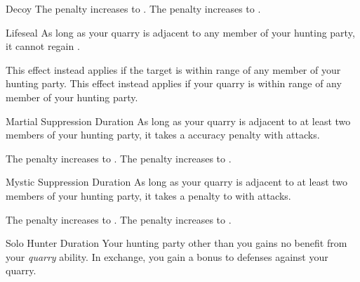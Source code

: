 {\begin{durationability}{Decoy}
                \rankline
                 The penalty increases to .
                 The penalty increases to .
            \end{durationability}

            \begin{durationability}{Lifeseal}
                \rankline
                As long as your quarry is adjacent to any member of your hunting party, it cannot regain .

                \rankline
                 This effect instead applies if the target is within \rngmed range of any member of your hunting party.
                 This effect instead applies if your quarry is within \rngdist range of any member of your hunting party.
            \end{durationability}

            \begin{durationability}{Martial Suppression}
                Duration
                \rankline
                As long as your quarry is adjacent to at least two members of your hunting party, it takes a  accuracy penalty with  attacks.

                \rankline
                 The penalty increases to .
                 The penalty increases to .
            \end{durationability}

            \begin{durationability}{Mystic Suppression}
                Duration
                \rankline
                As long as your quarry is adjacent to at least two members of your hunting party, it takes a  penalty to  with  attacks.

                \rankline
                 The penalty increases to . 
                 The penalty increases to .
            \end{durationability}

            \begin{durationability}{Solo Hunter}
                Duration
                \rankline
                Your hunting party other than you gains no benefit from your \textit{quarry} ability.
                In exchange, you gain a  bonus to defenses against your quarry.


\end{durationability}}
